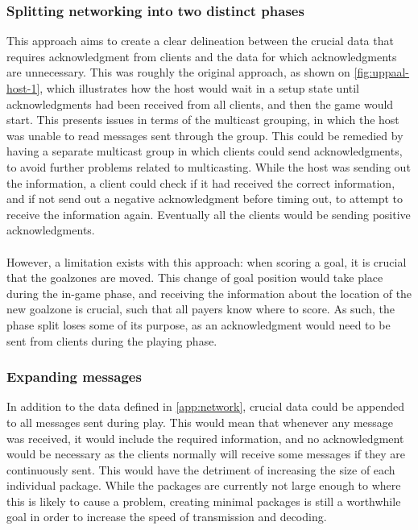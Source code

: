 \subsubsection{Splitting networking into two distinct phases}
This approach aims to create a clear delineation between the crucial data that requires acknowledgment from clients and the data for which acknowledgments are unnecessary.
This was roughly the original approach, as shown on \autoref{fig:uppaal-host-1}, which illustrates how the host would wait in a setup state until acknowledgments had been received from all clients, and then the game would start.
This presents issues in terms of the multicast grouping, in which the host was unable to read messages sent through the group.
This could be remedied by having a separate multicast group in which clients could send acknowledgments, to avoid further problems related to multicasting.
While the host was sending out the information, a client could check if it had received the correct information, and if not send out a negative acknowledgment before timing out, to attempt to receive the information again.
Eventually all the clients would be sending positive acknowledgments.
\\\\
However, a limitation exists with this approach: when scoring a goal, it is crucial that the goalzones are moved.
This change of goal position would take place during the in-game phase, and receiving the information about the location of the new goalzone is crucial, such that all payers know where to score.
As such, the phase split loses some of its purpose, as an acknowledgment would need to be sent from clients during the playing phase.

\subsubsection{Expanding messages}
In addition to the data defined in \autoref{app:network}, crucial data could be appended to all messages sent during play.
This would mean that whenever any message was received, it would include the required information, and no acknowledgment would be necessary as the clients normally will receive some messages if they are continuously sent.
This would have the detriment of increasing the size of each individual package.
While the packages are currently not large enough to where this is likely to cause a problem, creating minimal packages is still a worthwhile goal in order to increase the speed of transmission and decoding.

